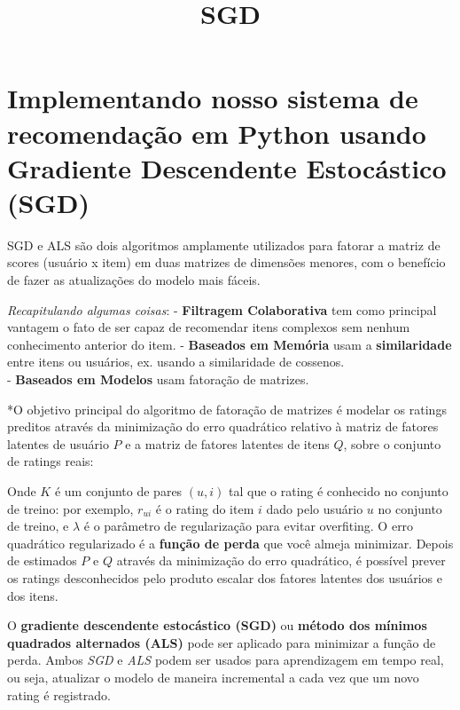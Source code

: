 \documentclass[11pt]{article}
\title{SGD}
\begin{document}
    
    
    \maketitle
    
    

    
    \section{Implementando nosso sistema de recomendação em Python usando
Gradiente Descendente Estocástico
(SGD)}\label{implementando-nosso-sistema-de-recomendauxe7uxe3o-em-python-usando-gradiente-descendente-estocuxe1stico-sgd}

    SGD e ALS são dois algoritmos amplamente utilizados para fatorar a
matriz de scores (usuário x item) em duas matrizes de dimensões menores,
com o benefício de fazer as atualizações do modelo mais fáceis.

\emph{Recapitulando algumas coisas}: - \textbf{Filtragem Colaborativa}
tem como principal vantagem o fato de ser capaz de recomendar itens
complexos sem nenhum conhecimento anterior do item. - \textbf{Baseados
em Memória} usam a \textbf{similaridade} entre itens ou usuários, ex.
usando a similaridade de cossenos.\\
- \textbf{Baseados em Modelos} usam fatoração de matrizes.

*O objetivo principal do algoritmo de fatoração de matrizes é modelar os
ratings preditos através da minimização do erro quadrático relativo à
matriz de fatores latentes de usuário \(P\) e a matriz de fatores
latentes de itens \(Q\), sobre o conjunto de ratings reais:

Onde \(K\) é um conjunto de pares \((u,i)\) tal que o rating é conhecido
no conjunto de treino: por exemplo, \(r_{ui}\) é o rating do item \(i\)
dado pelo usuário \(u\) no conjunto de treino, e \(\lambda\) é o
parâmetro de regularização para evitar overfiting. O erro quadrático
regularizado é a \textbf{função de perda} que você almeja minimizar.
Depois de estimados \(P\) e \(Q\) através da minimização do erro
quadrático, é possível prever os ratings desconhecidos pelo produto
escalar dos fatores latentes dos usuários e dos itens.

O \textbf{gradiente descendente estocástico (SGD)} ou \textbf{método dos
mínimos quadrados alternados (ALS)} pode ser aplicado para minimizar a
função de perda. Ambos \emph{SGD} e \emph{ALS} podem ser usados para
aprendizagem em tempo real, ou seja, atualizar o modelo de maneira
incremental a cada vez que um novo rating é registrado.
\end{document}
